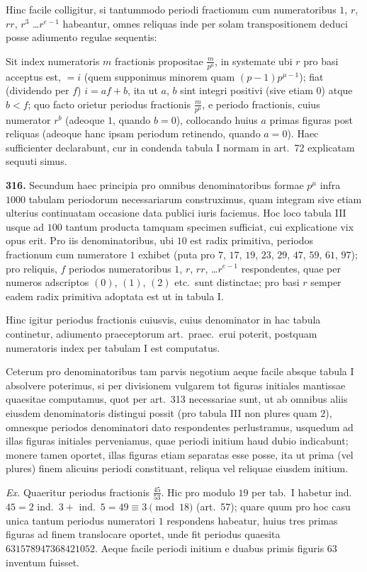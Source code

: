 \documentclass[12pt,a4paper]{article}
\theoremstyle{plain}
\theoremstyle{definition}
\theoremstyle{remark}
\begin{document}
Hinc facile colligitur, si tantummodo periodi fractionum cum numeratoribus $1$, $r$, $rr$, $r^3$ \ldots $r^{e-1}$ habeantur, omnes reliquas inde per solam transpositionem deduci posse adiumento regulae sequentis:

Sit index numeratoris $m$ fractionis propositae $\frac{m}{p^\mu}$, in systemate ubi $r$ pro basi acceptus est, $= i$ (quem supponimus minorem quam $(p-1)p^{\mu-1}$); fiat (dividendo per $f$) $i = af + b$, ita ut $a$, $b$ sint integri positivi (sive etiam $0$) atque $b < f$; quo facto orietur periodus fractionis $\frac{m}{p^\mu}$, e periodo fractionis, cuius numerator $r^b$ (adeoque $1$, quando $b = 0$), collocando huius $a$ primas figuras post reliquas (adeoque hanc ipsam periodum retinendo, quando $a = 0$). Haec sufficienter declarabunt, cur in condenda tabula I normam in art.~72 explicatam sequuti simus.

\textbf{316.} Secundum haec principia pro omnibus denominatoribus formae $p^\mu$ infra $1000$ tabulam periodorum necessariarum construximus, quam integram sive etiam ulterius continuatam occasione data publici iuris faciemus. Hoc loco tabula III usque ad $100$ tantum producta tamquam specimen sufficiat, cui explicatione vix opus erit. Pro iis denominatoribus, ubi $10$ est radix primitiva, periodos fractionum cum numeratore $1$ exhibet (puta pro $7$, $17$, $19$, $23$, $29$, $47$, $59$, $61$, $97$); pro reliquis, $f$ periodos numeratoribus $1$, $r$, $rr$, \ldots $r^{e-1}$ respondentes, quae per numeros adscriptos $(0)$, $(1)$, $(2)$ etc.~sunt distinctae; pro basi $r$ semper eadem radix primitiva adoptata est ut in tabula I.

Hinc igitur periodus fractionis cuiusvis, cuius denominator in hac tabula continetur, adiumento praeceptorum art.~praec.~erui poterit, postquam numeratoris index per tabulam I est computatus.

Ceterum pro denominatoribus tam parvis negotium aeque facile absque tabula I absolvere poterimus, si per divisionem vulgarem tot figuras initiales mantissae quaesitae computamus, quot per art.~313 necessariae sunt, ut ab omnibus aliis eiusdem denominatoris distingui possit (pro tabula III non plures quam $2$), omnesque periodos denominatori dato respondentes perlustramus, usquedum ad illas figuras initiales perveniamus, quae periodi initium haud dubio indicabunt; monere tamen oportet, illas figuras etiam separatas esse posse, ita ut prima (vel plures) finem alicuius periodi constituant, reliqua vel reliquae eiusdem initium.

\textit{Ex.} Quaeritur periodus fractionis $\frac{45}{53}$. Hic pro modulo $19$ per tab.~I habetur ind.~$45 = 2$ ind.~$3 +$ ind.~$5 = 49 \equiv 3 \pmod{18}$ (art.~57); quare quum pro hoc casu unica tantum periodus numeratori $1$ respondens habeatur, huius tres primas figuras ad finem translocare oportet, unde fit periodus quaesita $631578947368421052$. Aeque facile periodi initium e duabus primis figuris $63$ inventum fuisset.
\end{document}
